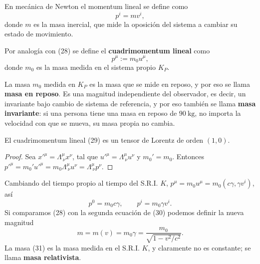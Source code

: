 En mecánica de Newton el momentum lineal se define como
\[
p^i = mv^i, \tag{28}
\]
donde $m$ es la masa inercial, que mide la oposición del sistema a
cambiar su estado de movimiento.

\begin{definicion}
Por analogía con (28) se define el \textbf{cuadrimomentum lineal} como
\[
p^\mu := m_0u^\mu, \tag{29}
\]
donde $m_0$ es la masa medida en el sistema propio $K_P$.
\end{definicion}

La masa $m_0$ medida en $K_P$ es la masa que se mide en reposo, y por eso
se llama \textbf{masa en reposo}. Es una magnitud independiente del
observador, es decir, un invariante bajo cambio de sistema de
referencia, y por eso también se llama \textbf{masa invariante}: si una
persona tiene una masa en reposo de $90\ \text{kg}$, no importa la
velocidad con que se mueva, su masa propia no cambia.

\begin{proposicionc}
El cuadrimomentum lineal (29) es un tensor de Lorentz de orden $(1,0)$.
\end{proposicionc}

\begin{proof}
Sea $x'^\mu=\Lambda^\mu_{\ \nu}x^\nu$, tal que $u'^\mu=\Lambda^\mu_{\
\nu}u^\nu$ y $m_0'=m_0$. Entonces $p'^\mu=m_0'u'^\mu=m_0\Lambda^\mu_{\
\nu}u^\nu=\Lambda^\mu_{\ \nu}p^\nu$. \qedhere
\end{proof}

Cambiando del tiempo propio al tiempo del S.R.I. $K$,
$p^\mu=m_0u^\mu=m_0(c\gamma,\gamma v^i)$, así
\[
p^0 = m_0c\gamma, \qquad p^i = m_0\gamma v^i . \tag{30}
\]
Si comparamos (28) con la segunda ecuación de (30) podemos definir la
nueva magnitud
\[
m = m(v) = m_0\gamma = \frac{m_0}{\sqrt{1-v^2/c^2}} . \tag{31}
\]
La masa (31) es la masa medida en el S.R.I. $K$, y claramente no es
constante; se llama \textbf{masa relativista}.

\begin{center}
\end{center}

